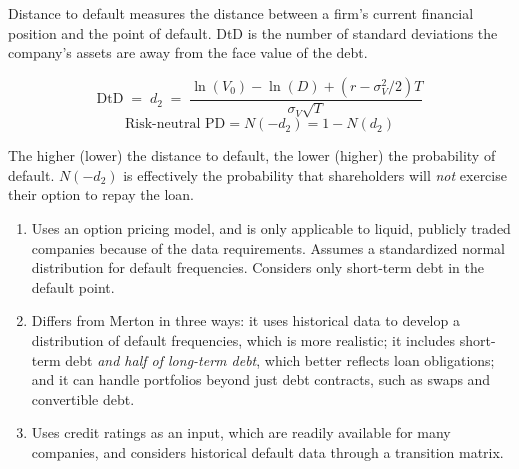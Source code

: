 
Distance to default measures the distance between a firm's current financial
position and the point of default. DtD is the number of standard deviations the
company's assets are away from the face value of the debt.

\begin{crfmlbox}
\[ \mathrm{DtD} \;=\; d_2 \;=\;
   \frac{\ln(V_0) - \ln(D) + (r - \sigma_V^{2}/2)T}{\sigma_V\sqrt{T}} \]
\[ \text{Risk-neutral PD} = N(-d_2) = 1 - N(d_2) \]
\end{crfmlbox}

\begin{crkeybox}[Direction]
The higher (lower) the distance to default, the lower (higher) the probability of
default. $N(-d_2)$ is effectively the probability that shareholders will
\emph{not} exercise their option to repay the loan.
\end{crkeybox}


\begin{enumerate}
\item {} Uses an option pricing model, and is only applicable
to liquid, publicly traded companies because of the data requirements. Assumes a
standardized normal distribution for default frequencies. Considers only
short-term debt in the default point.
\item {} Differs from
Merton in three ways: it uses historical data to develop a distribution of default
frequencies, which is more realistic; it includes short-term debt \emph{and half
of long-term debt}, which better reflects loan obligations; and it can handle
portfolios beyond just debt contracts, such as swaps and convertible debt.
\item {} Uses credit ratings as an input, which are readily
available for many companies, and considers historical default data through a
transition matrix.
\end{enumerate}

